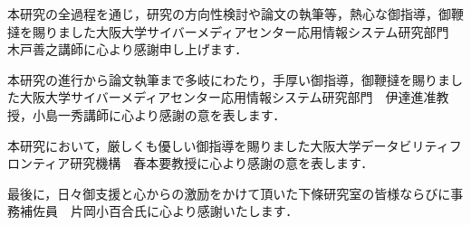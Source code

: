 \documentclass[12pt,a4paper]{jbook}
\begin{document}
本研究の全過程を通じ，研究の方向性検討や論文の執筆等，熱心な御指導，御鞭撻を賜りました大阪大学サイバーメディアセンター応用情報システム研究部門　木戸善之講師に心より感謝申し上げます．

本研究の進行から論文執筆まで多岐にわたり，手厚い御指導，御鞭撻を賜りました大阪大学サイバーメディアセンター応用情報システム研究部門　伊達進准教授，小島一秀講師に心より感謝の意を表します．


本研究において，厳しくも優しい御指導を賜りました大阪大学データビリティフロンティア研究機構　春本要教授に心より感謝の意を表します．

最後に，日々御支援と心からの激励をかけて頂いた下條研究室の皆様ならびに事務補佐員　片岡小百合氏に心より感謝いたします．



\end{document}
